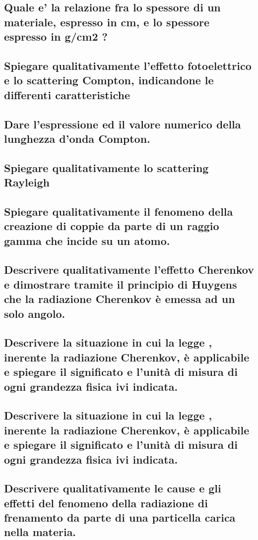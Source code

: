 \subsection[]{Quale e' la relazione fra lo spessore di un materiale, espresso in cm, e lo spessore espresso in g/cm2 ?
}
\subsection[]{Spiegare qualitativamente l’effetto fotoelettrico e lo scattering Compton, indicandone le differenti caratteristiche
}
\subsection[]{Dare l'espressione ed il valore numerico della lunghezza d'onda Compton.
}
\subsection[]{Spiegare qualitativamente lo scattering Rayleigh
}
\subsection[]{Spiegare qualitativamente il fenomeno della creazione di coppie  da parte di un raggio gamma che incide su un atomo.
}
\subsection[]{Descrivere qualitativamente l’effetto Cherenkov e dimostrare tramite il principio di Huygens che la radiazione Cherenkov è emessa ad un solo angolo.
}
\subsection[]{Descrivere la situazione in cui la legge 
	, inerente la radiazione Cherenkov, è applicabile e spiegare il significato e l'unità di misura di ogni grandezza fisica ivi indicata.
}
\subsection[]{Descrivere la situazione in cui la legge 
	, inerente la radiazione Cherenkov, è applicabile e spiegare il significato e l'unità di misura di ogni grandezza fisica ivi indicata.
}
\subsection[]{Descrivere qualitativamente le cause e gli effetti del fenomeno della radiazione di frenamento da parte di una particella carica nella materia.
}
